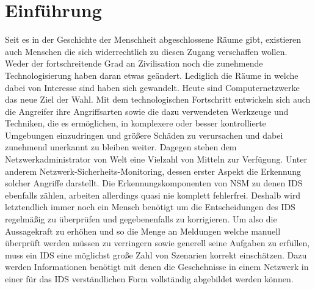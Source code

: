 \chapter{Einführung}
\label{cha:introduction}

Seit es in der Geschichte der Menschheit abgeschlossene Räume gibt, existieren auch Menschen die sich widerrechtlich zu diesen Zugang verschaffen wollen. Weder der fortschreitende Grad an Zivilisation noch die zunehmende Technologisierung haben daran etwas geändert. Lediglich die Räume in welche dabei von Interesse sind haben sich gewandelt. Heute sind Computernetzwerke das neue Ziel der Wahl. Mit dem technologischen Fortschritt entwickeln sich auch die Angreifer ihre Angriffsarten sowie die dazu verwendeten Werkzeuge und Techniken, die es ermöglichen, in komplexere oder besser kontrollierte Umgebungen einzudringen und größere Schäden zu verursachen und dabei zunehmend unerkannt zu bleiben weiter.
Dagegen stehen dem Netzwerkadministrator von Welt eine Vielzahl von Mitteln zur Verfügung. Unter anderem Netzwerk-Sicherheits-Monitoring, dessen erster Aspekt die Erkennung solcher Angriffe darstellt.
Die Erkennungskomponenten von NSM zu denen IDS ebenfalls zählen, arbeiten allerdings quasi nie komplett fehlerfrei. Deshalb wird letztendlich immer noch ein Mensch benötigt um die Entscheidungen des IDS regelmäßig zu überprüfen und gegebenenfalls zu korrigieren. Um also die Aussagekraft zu erhöhen und so die Menge an Meldungen welche manuell überprüft werden müssen zu verringern sowie generell seine Aufgaben zu erfüllen, muss ein IDS eine möglichst große Zahl von Szenarien korrekt einschätzen. Dazu werden Informationen benötigt mit denen die Geschehnisse in einem Netzwerk in einer für das IDS verständlichen Form vollständig abgebildet werden können.      

